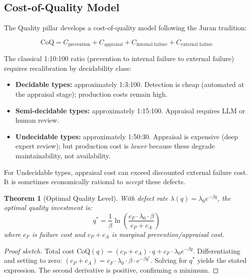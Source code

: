 \documentclass[11pt, a4paper, logo, copyright]{googledeepmind}
\newtheorem{theorem}{Theorem}[section]
\begin{document}
\subsection{Cost-of-Quality Model}

The Quality pillar develops a cost-of-quality model following the Juran tradition:

\begin{equation}
    \text{CoQ} = C_{\text{prevention}} + C_{\text{appraisal}} + C_{\text{internal failure}} + C_{\text{external failure}}
\end{equation}

The classical 1:10:100 ratio (prevention to internal failure to external failure) requires recalibration by decidability class:

\begin{itemize}
\item \textbf{Decidable types:} approximately 1:3:100. Detection is cheap (automated at the appraisal stage); production costs remain high.
\item \textbf{Semi-decidable types:} approximately 1:15:100. Appraisal requires LLM or human review.
\item \textbf{Undecidable types:} approximately 1:50:30. Appraisal is expensive (deep expert review); but production cost is \emph{lower} because these degrade maintainability, not availability.
\end{itemize}

For Undecidable types, appraisal cost can exceed discounted external failure cost. It is sometimes economically rational to \emph{accept} these defects.

\begin{theorem}[Optimal Quality Level]
\label{thm:optquality}
With defect rate $\lambda(q) = \lambda_0 e^{-\beta q}$, the optimal quality investment is:
\begin{equation}
q^* = \frac{1}{\beta} \ln\!\left(\frac{c_F \cdot \lambda_0 \cdot \beta}{c_P + c_A}\right)
\end{equation}
where $c_F$ is failure cost and $c_P + c_A$ is marginal prevention/appraisal cost.
\end{theorem}

\begin{proof}[Proof sketch]
Total cost $\text{CoQ}(q) = (c_P + c_A) \cdot q + c_F \cdot \lambda_0 e^{-\beta q}$. Differentiating and setting to zero: $(c_P + c_A) = c_F \cdot \lambda_0 \cdot \beta \cdot e^{-\beta q^*}$. Solving for $q^*$ yields the stated expression. The second derivative is positive, confirming a minimum.
\end{proof}
\end{document}
